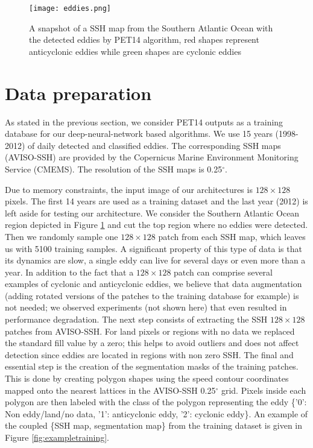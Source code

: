 \documentclass[journal]{IEEEtran}
\begin{document}
\begin{figure}[t]
\centering
\texttt{[image: eddies.png]}
\caption{A snapshot of a SSH map from the Southern Atlantic Ocean with the detected eddies by PET14 algorithm, red shapes represent anticyclonic eddies while green shapes are cyclonic eddies}
\label{fig:eddies}
\end{figure}

\section{Data preparation}

As stated in the previous section, we consider PET14 outputs as a training database for our deep-neural-network based algorithms. We use 15 years (1998-2012) of daily detected and classified eddies. The corresponding SSH maps (AVISO-SSH) are provided by the Copernicus Marine Environment Monitoring Service (CMEMS). The resolution of the SSH maps is 0.25$^\circ$.

Due to memory constraints, the input image of our architectures is $128 \times 128$ pixels. The first 14 years are used as a training dataset and the last year (2012) is left aside for testing our architecture. We consider the Southern Atlantic Ocean region depicted in Figure \ref{fig:eddies} and cut the top region where no eddies were detected. Then we randomly sample  one $128 \times 128$ patch from each SSH map, which leaves us with 5100 training samples. A significant property of this type of data is that its dynamics are slow, a single eddy can live for several days or even more than a year. In addition to the fact that a $128 \times 128$ patch can comprise several examples of cyclonic and anticyclonic eddies, we believe that data augmentation (adding rotated versions of the patches to the training database for example) is not needed; we observed experiments (not shown here) that even resulted in performance degradation. The next step consists of extracting the SSH $128 \times 128$ patches from AVISO-SSH. For land pixels or regions with no data we replaced the standard fill value by a zero; this helps to  avoid outliers and does not affect detection since eddies are located in regions with non zero SSH. The final and essential step is the creation of the segmentation masks of the training patches. This is done by creating polygon shapes using the speed contour coordinates mapped onto the nearest lattices in the AVISO-SSH 0.25$^\circ$ grid. Pixels inside each polygon are then labeled with the class of the polygon representing the eddy \{'0': Non eddy/land/no data, '1': anticyclonic eddy, '2': cyclonic eddy\}. An example of the coupled \{SSH map, segmentation map\} from the training dataset is given in Figure \ref{fig:exampletraining}.
\end{document}
